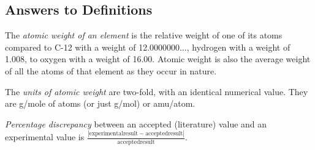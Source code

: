 \documentclass{article}
\makeatletter
\renewcommand{\labelenumi}{\alph{enumi}.} %
\newcommand{\tabincell}[2]
{
	\begin{tabular}
	{@{}#1@{}}#2
	\end{tabular}
}
\makeatother
\begin{document}
\begin{CJK*}{UTF8}{gkai}

\section{Answers to Definitions}

\begin{enumerate}
\begin{item}
The \emph{atomic weight of an element} is the relative weight of one of its atoms compared to C-12 with a weight of 12.0000000$\ldots$, hydrogen with a weight of 1.008, to oxygen with a weight of 16.00. Atomic weight is also the average weight of all the atoms of that element as they occur in nature.
\end{item}
\begin{item}
The \emph{units of atomic weight} are two-fold, with an identical numerical value. They are g/mole of atoms (or just g/mol) or amu/atom.
\end{item}
\begin{item}
\emph{Percentage discrepancy} between an accepted (literature) value and an experimental value is $\frac{|\mathrm{experimental result} - \mathrm{accepted result}|}{\mathrm{accepted result}}$.
\end{item}
\end{enumerate}









%
%
%
%
%
%




\end{CJK*}
\end{document}
